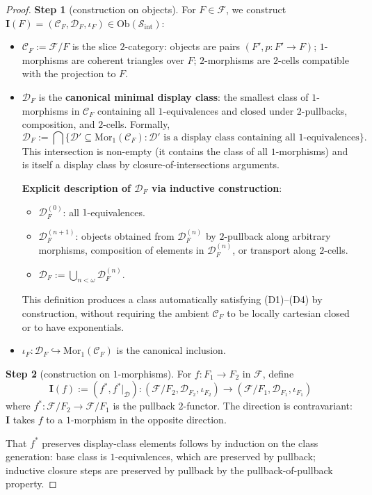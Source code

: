 \documentclass[11pt]{article}
\theoremstyle{plain}
\theoremstyle{definition}
\newcommand{\cS}{\mathcal{S}}
\newcommand{\cF}{\mathcal{F}}
\newcommand{\cC}{\mathcal{C}}
\newcommand{\cD}{\mathcal{D}}
\newcommand{\Sint}{\cS_{\mathrm{int}}}
\newcommand{\Ob}{\mathrm{Ob}}
\newcommand{\Mor}{\mathrm{Mor}}
\newcommand{\II}{\mathbf{I}}
\begin{document}
\begin{proof}

\textbf{Step 1} (construction on objects). For $F \in \cF$, we construct $\II(F) = (\cC_F, \cD_F, \iota_F) \in \Ob(\Sint)$:
\begin{itemize}
\item $\cC_F := \cF / F$ is the slice $2$-category: objects are pairs $(F', p : F' \to F)$; $1$-morphisms are coherent triangles over $F$; $2$-morphisms are $2$-cells compatible with the projection to $F$.
\item $\cD_F$ is the \textbf{canonical minimal display class}: the smallest class of $1$-morphisms in $\cC_F$ containing all $1$-equivalences and closed under $2$-pullbacks, composition, and $2$-cells. Formally,
\[ \cD_F := \bigcap \{\cD' \subseteq \Mor_1(\cC_F) : \cD' \text{ is a display class containing all } 1\text{-equivalences}\}. \]
This intersection is non-empty (it contains the class of all $1$-morphisms) and is itself a display class by closure-of-intersections arguments.

\textbf{Explicit description of $\cD_F$ via inductive construction}:
\begin{itemize}
\item $\cD_F^{(0)}$: all $1$-equivalences.
\item $\cD_F^{(n+1)}$: objects obtained from $\cD_F^{(n)}$ by $2$-pullback along arbitrary morphisms, composition of elements in $\cD_F^{(n)}$, or transport along $2$-cells.
\item $\cD_F := \bigcup_{n < \omega} \cD_F^{(n)}$.
\end{itemize}
This definition produces a class automatically satisfying (D1)--(D4) by construction, without requiring the ambient $\cC_F$ to be locally cartesian closed or to have exponentials.

\item $\iota_F : \cD_F \hookrightarrow \Mor_1(\cC_F)$ is the canonical inclusion.
\end{itemize}

\textbf{Step 2} (construction on $1$-morphisms). For $f : F_1 \to F_2$ in $\cF$, define
\[ \II(f) := (f^*, f^*|_\cD) : (\cF / F_2, \cD_{F_2}, \iota_{F_2}) \to (\cF / F_1, \cD_{F_1}, \iota_{F_1}) \]
where $f^* : \cF / F_2 \to \cF / F_1$ is the pullback $2$-functor. The direction is contravariant: $\II$ takes $f$ to a $1$-morphism in the opposite direction.

That $f^*$ preserves display-class elements follows by induction on the class generation: base class is $1$-equivalences, which are preserved by pullback; inductive closure steps are preserved by pullback by the pullback-of-pullback property.


\end{proof}
\end{document}
